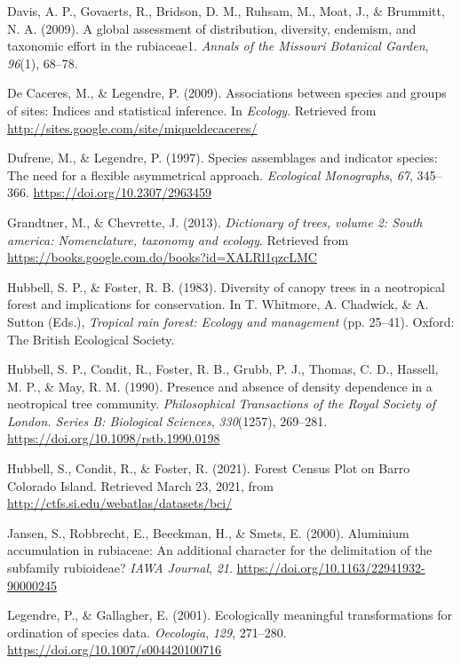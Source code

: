 \documentclass[11pt,]{article}
\begin{document}
\hypertarget{ref-davis2009global}{}
Davis, A. P., Govaerts, R., Bridson, D. M., Ruhsam, M., Moat, J., \&
Brummitt, N. A. (2009). A global assessment of distribution, diversity,
endemism, and taxonomic effort in the rubiaceae1. \emph{Annals of the
Missouri Botanical Garden}, \emph{96}(1), 68--78.

\hypertarget{ref-cita_indicspecies}{}
De Caceres, M., \& Legendre, P. (2009). Associations between species and
groups of sites: Indices and statistical inference. In \emph{Ecology}.
Retrieved from \url{http://sites.google.com/site/miqueldecaceres/}

\hypertarget{ref-dufrene_legendre}{}
Dufrene, M., \& Legendre, P. (1997). Species assemblages and indicator
species: The need for a flexible asymmetrical approach. \emph{Ecological
Monographs}, \emph{67}, 345--366. \url{https://doi.org/10.2307/2963459}

\hypertarget{ref-grandtner2013dictionary}{}
Grandtner, M., \& Chevrette, J. (2013). \emph{Dictionary of trees,
volume 2: South america: Nomenclature, taxonomy and ecology}. Retrieved
from \url{https://books.google.com.do/books?id=XALRl1qzcLMC}

\hypertarget{ref-hubell_foster_1983}{}
Hubbell, S. P., \& Foster, R. B. (1983). Diversity of canopy trees in a
neotropical forest and implications for conservation. In T. Whitmore, A.
Chadwick, \& A. Sutton (Eds.), \emph{Tropical rain forest: Ecology and
management} (pp. 25--41). Oxford: The British Ecological Society.

\hypertarget{ref-hubell_et_all_1990}{}
Hubbell, S. P., Condit, R., Foster, R. B., Grubb, P. J., Thomas, C. D.,
Hassell, M. P., \& May, R. M. (1990). Presence and absence of density
dependence in a neotropical tree community. \emph{Philosophical
Transactions of the Royal Society of London. Series B: Biological
Sciences}, \emph{330}(1257), 269--281.
\url{https://doi.org/10.1098/rstb.1990.0198}

\hypertarget{ref-web_bci}{}
Hubbell, S., Condit, R., \& Foster, R. (2021). Forest Census Plot on
Barro Colorado Island. Retrieved March 23, 2021, from
\url{http://ctfs.si.edu/webatlas/datasets/bci/}

\hypertarget{ref-article}{}
Jansen, S., Robbrecht, E., Beeckman, H., \& Smets, E. (2000). Aluminium
accumulation in rubiaceae: An additional character for the delimitation
of the subfamily rubioideae? \emph{IAWA Journal}, \emph{21}.
\url{https://doi.org/10.1163/22941932-90000245}

\hypertarget{ref-legendre_galllagher_2001}{}
Legendre, P., \& Gallagher, E. (2001). Ecologically meaningful
transformations for ordination of species data. \emph{Oecologia},
\emph{129}, 271--280. \url{https://doi.org/10.1007/s004420100716}
\end{document}
